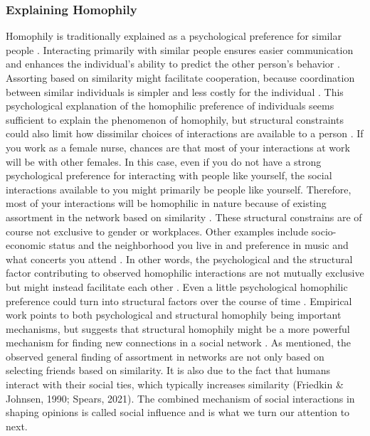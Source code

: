 \documentclass{article}
\begin{document}
\subsubsection{Explaining Homophily}
Homophily is traditionally explained as a psychological preference for similar people \cite{asikainen_cumulative_2020,mcpherson_birds_2001,winter_you_2020}. Interacting primarily with similar people ensures easier communication and enhances the individual’s ability to predict the other person’s behavior \cite{kossinets_origins_2009,winter_you_2020}. Assorting based on similarity might facilitate cooperation, because coordination between similar individuals is simpler and less costly for the individual \cite{winter_you_2020}. This psychological explanation of the homophilic preference of individuals seems sufficient to explain the phenomenon of homophily, but structural constraints could also limit how dissimilar choices of interactions are available to a person \cite{peixoto_disentangling_2022}. If you work as a female nurse, chances are that most of your interactions at work will be with other females. In this case, even if you do not have a strong psychological preference for interacting with people like yourself, the social interactions available to you might primarily be people like yourself. Therefore, most of your interactions will be homophilic in nature because of existing assortment in the network based on similarity \cite{peixoto_disentangling_2022}. These structural constrains are of course not exclusive to gender or workplaces. Other examples include socio-economic status and the neighborhood you live in and preference in music and what concerts you attend \cite{mcpherson_birds_2001}. In other words, the psychological and the structural factor contributing to observed homophilic interactions are not mutually exclusive but might instead facilitate each other \cite{asikainen_cumulative_2020}. Even a little psychological homophilic preference could turn into structural factors over the course of time \cite{asikainen_cumulative_2020,kossinets_origins_2009,taylor_exploring_2018}. Empirical work points to both psychological and structural homophily being important mechanisms, but suggests that structural homophily might be a more powerful mechanism for finding new connections in a social network \cite{bener_empirical_2016,kossinets_origins_2009}.
As mentioned, the observed general finding of assortment in networks are not only based on selecting friends based on similarity. It is also due to the fact that humans interact with their social ties, which typically increases similarity (Friedkin \& Johnsen, 1990; Spears, 2021). The combined mechanism of social interactions in shaping opinions is called social influence and is what we turn our attention to next. 
\end{document}
